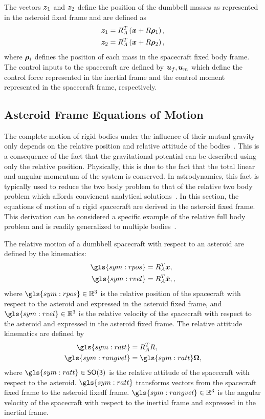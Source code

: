 The vectors \( \bm{z}_1 \) and \( \bm{z}_2\) define the position of the dumbbell masses as represented in the asteroid fixed frame and are defined as
\begin{align}
    \bm{z}_1 &= R_A^T \left( \bm{x} + R \bm{\rho}_1 \right) , \\
    \bm{z}_2 &= R_A^T \left( \bm{x} + R \bm{\rho}_2 \right), 
\end{align}
where \( \bm{\rho}_i \) defines the position of each mass in the spacecraft fixed body frame.
The control inputs to the spacecraft are defined by \( \bm{u}_f, \bm{u}_m \) which define the control force represented in the inertial frame and the control moment represented in the spacecraft frame, respectively. 
\subsection{Asteroid Frame Equations of Motion}
The complete motion of rigid bodies under the influence of their mutual gravity only depends on the relative position and relative attitude of the bodies~\cite{lee2007a}.
This is a consequence of the fact that the gravitational potential can be described using only the relative position.
Physically, this is due to the fact that the total linear and angular momentum of the system is conserved.
In astrodynamics, this fact is typically used to reduce the two body problem to that of the relative two body problem which affords convienent analytical solutions~\cite{vallado2007,bate1971}.
In this section, the equations of motion of a rigid spacecraft are derived in the asteroid fixed frame.
This derivation can be considered a specific example of the relative full body problem and is readily generalized to multiple bodies~\cite{lee2007a}.

The relative motion of a dumbbell spacecraft with respect to an asteroid are defined by the kinematics:
\begin{align}
    \gls{sym:rpos} &= R_A^T \vc{x}, \label{eq:relative_position} \\
    \gls{sym:rvel} &= R_A^T \dot{\vc{x}}, \label{eq:relative_velocity},
\end{align}
where \( \gls{sym:rpos} \in \R^3 \) is the relative position of the spacecraft with respect to the asteroid and expressed in the asteroid fixed frame, and \( \gls{sym:rvel} \in \R^3 \) is the relative velocity of the spacecraft with respect to the asteroid and expressed in the asteroid fixed frame.
The relative attitude kinematics are defined by
\begin{align}
    \gls{sym:ratt} &= R_A^T R, \label{eq:relative_attitude} \\
    \gls{sym:rangvel} &= \gls{sym:ratt} \vc{\Omega}, \label{eq:relative_angular_velocity}
\end{align}
where \( \gls{sym:ratt} \in \SO \) is the relative attitude of the spacecraft with respect to the asteroid.
\( \gls{sym:ratt} \) transforms vectors from the spacecraft fixed frame to the asteroid fixedf frame.
\( \gls{sym:rangvel} \in \R^3 \) is the angular velocity of the spacecraft with respect to the inertial frame and expressed in the inertial frame.

